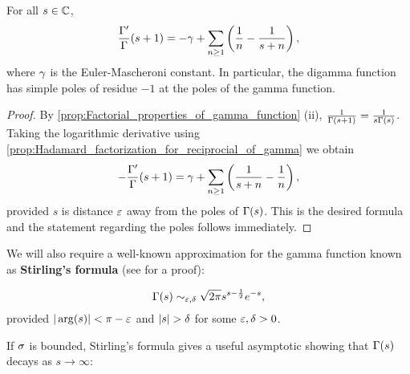     \begin{corollary}\label{cor:logarithmic_derivative_of_gamma}
      For all $s \in \mathbb{C}$,
      \[
        \frac{\Gamma'}{\Gamma}(s+1) = -\gamma+\sum_{n \ge 1}\left(\frac{1}{n}-\frac{1}{s+n}\right),
      \]
      where $\gamma$ is the Euler-Mascheroni constant. In particular, the digamma function has simple poles of residue $-1$ at the poles of the gamma function.
    \end{corollary}
    \begin{proof}
      By \cref{prop:Factorial_properties_of_gamma_function} (ii), $\frac{1}{\Gamma(s+1)} = \frac{1}{s\Gamma(s)}$. Taking the logarithmic derivative using \cref{prop:Hadamard_factorization_for_reciprocial_of_gamma} we obtain
      \[
        -\frac{\Gamma'}{\Gamma}(s+1) = \gamma+\sum_{n \ge 1}\left(\frac{1}{s+n}-\frac{1}{n}\right),
      \]
      provided $s$ is distance $\varepsilon$ away from the poles of $\Gamma(s)$. This is the desired formula and the statement regarding the poles follows immediately.
    \end{proof}
    
    We will also require a well-known approximation for the gamma function known as \textbf{Stirling's formula} (see \cite{remmert1998classical} for a proof):

    \begin{theorem*}
      \phantom{}
      \[
        \Gamma(s) \sim_{\varepsilon,\delta} \sqrt{2\pi}s^{s-\frac{1}{2}}e^{-s},
      \]
      provided $|\arg(s)| < \pi-\varepsilon$ and $|s| > \delta$ for some $\varepsilon,\delta > 0$.
    \end{theorem*}

    If $\sigma$ is bounded, Stirling's formula gives a useful asymptotic showing that $\Gamma(s)$ decays as $s \to \infty$:
    
